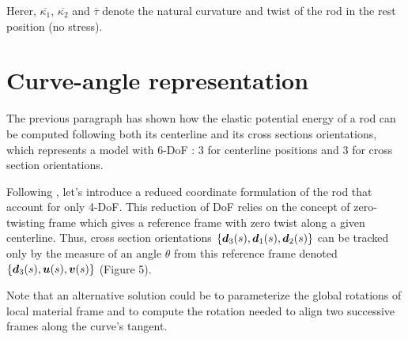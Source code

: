Herer, $\overbar{\kappa_1}$, $\overbar{\kappa_2}$ and $\overbar{\tau}$  denote the natural curvature and twist of the rod in the rest position (no stress).

\section{Curve-angle representation}
The previous paragraph has shown how the elastic potential energy of a rod can be computed following both its centerline and its cross sections orientations, which represents a model with 6-DoF : 3 for centerline positions and 3 for cross section orientations.

Following \cite{Bergou2008}, let’s introduce a reduced coordinate formulation of the rod that account for only 4-DoF. This reduction of DoF relies on the concept of zero-twisting frame which gives a reference frame with zero twist along a given centerline. Thus, cross section orientations $\{\boldsymbol{d}_3 (s),\boldsymbol{d}_1 (s),\boldsymbol{d}_2 (s)\}$ can be tracked only by the measure of an angle $\theta$ from this reference frame denoted $\{\boldsymbol{d}_3(s),\boldsymbol{u}(s),\boldsymbol{v}(s)\}$ (Figure 5).

Note that an alternative solution could be to parameterize the global rotations of local material frame and to compute the rotation needed to align two successive frames along the curve’s tangent.


